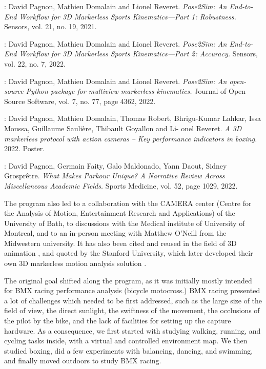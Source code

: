 \noindent\cite{Pagnon2021}: David Pagnon, Mathieu Domalain and Lionel Reveret. \textit{Pose2Sim: An
End-to-End Workflow for 3D Markerless Sports Kinematics—Part 1:
Robustness.} Sensors, vol. 21, no. 19, 2021.

\noindent\cite{Pagnon2022a}: David Pagnon, Mathieu Domalain and Lionel Reveret. \textit{Pose2Sim: An
End-to-End Workflow for 3D Markerless Sports Kinematics—Part 2:
Accuracy.} Sensors, vol. 22, no. 7, 2022.

\noindent\cite{Pagnon2022b}: David Pagnon, Mathieu Domalain and Lionel Reveret. \textit{Pose2Sim:
An open-source Python package for multiview markerless kinematics.}
Journal of Open Source Software, vol. 7, no. 77, page 4362, 2022.

\noindent\cite{Pagnon2022c}: David Pagnon, Mathieu Domalain, Thomas Robert, Bhrigu-Kumar
Lahkar, Issa Moussa, Guillaume Saulière, Thibault Goyallon and Li-
onel Reveret. \textit{A 3D markerless protocol with action cameras – Key
performance indicators in boxing.} 2022. Poster.

\noindent\cite{Pagnon2022d}: David Pagnon, Germain Faity, Galo Maldonado, Yann Daout, Sidney Grosprêtre. \textit{What Makes Parkour Unique? A Narrative Review Across Miscellaneous Academic Fields.} Sports Medicine, vol. 52, page 1029, 2022.

The program also led to a collaboration with the CAMERA center (Centre for the Analysis of Motion, Entertainment Research and Applications) of the University of Bath, to discussions with the Medical institute of University of Montreal, and to an in-person meeting with Matthew O'Neill from the Midwestern university. It has also been cited and reused in the field of 3D animation \cite{Barreto2022}, and quoted by the Stanford University, which later developed their own 3D markerless motion analysis solution \cite{Uhlrich2022}.

\vspace*{0.5cm}

The original goal shifted along the program, as it was initially mostly intended for BMX racing performance analysis (bicycle motocross.) BMX racing presented a lot of challenges which needed to be first addressed, such as the large size of the field of view, the direct sunlight, the swiftness of the movement, the occlusions of the pilot by the bike, and the lack of facilities for setting up the capture hardware. As a consequence, we first started with studying walking, running, and cycling tasks inside, with a virtual and controlled environment map. We then studied boxing, did a few experiments with balancing, dancing, and swimming, and finally moved outdoors to study BMX racing.

